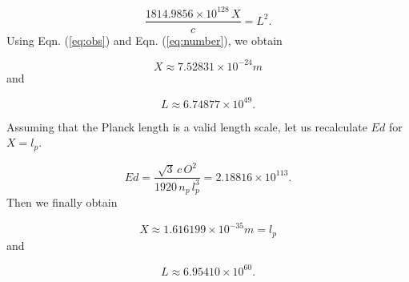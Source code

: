 \documentclass{ijuc}
\begin{document}
\begin{equation}
\frac{1814.9856\times10^{128}\,X}{c}=L^{2}.\label{eq:number}
\end{equation}
Using Eqn. (\ref{eq:obs}) and Eqn. (\ref{eq:number}), we obtain 

\[
X\approx7.52831\times10^{-24}m
\]
and

\[
L\approx6.74877\times10^{49}.
\]

Assuming that the Planck length is a valid length scale, let us recalculate
$Ed$ for $X=l_{p}$.

\[
Ed=\frac{\sqrt{3}\,c\,O^{2}}{1920\,n_{p}\,l_{p}^{3}}=2.18816\times10^{113}.
\]
Then we finally obtain

\[
X\approx1.616199\times10^{-35}m=l_{p}
\]
and

\[
L\approx6.95410\times10^{60}.
\]

\end{document}
